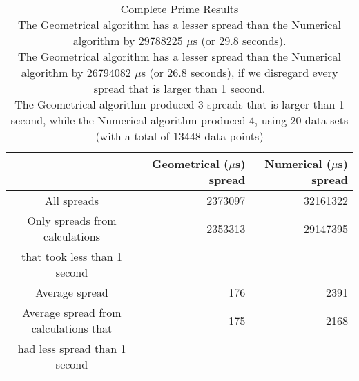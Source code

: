 \begin{table}[bth!]\footnotesize
 \begin{tabular}[3]{c|r|r}
 & Geometrical ($\mu$s) spread & Numerical ($\mu$s) spread\\
\hline
All spreads & 2373097 & 32161322 \\ 
\hline 
Only spreads from calculations & 2353313 & 29147395 \\ 
that took less than 1 second & & \\ 
\hline
Average spread & 176 & 2391 \\
\hline
Average spread from calculations that & 175 & 2168 \\ 
had less spread than 1 second & & \\ 
\end{tabular}\\ \\
\caption{Complete Prime Results\\
The Geometrical algorithm has a lesser spread than the Numerical algorithm by 29788225 $\mu$s (or 29.8 seconds).\\
The Geometrical algorithm has a lesser spread than the Numerical algorithm by 26794082 $\mu$s (or 26.8 seconds), if we disregard every spread that is larger than 1 second.\\
The Geometrical algorithm produced 3 spreads that is larger than 1 second, while the Numerical algorithm produced 4, using 20 data sets (with a total of 13448 data points)\\
}\label{prime_spreadtable}\end{table}